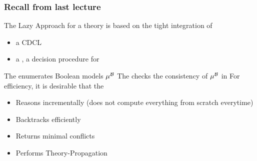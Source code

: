 \begin{frame}
  \frametitle{Recall from last lecture}

  The Lazy Approach for a theory \T is based on the tight integration of
  \begin{itemize}
    \item a CDCL \satsolver
    \item a \tsolver, a decision procedure for \T
  \end{itemize}
  \vfill
  \pause
  The \satsolver enumerates Boolean models $\mu^{\mathcal{B}}$
  \vfill
  The \tsolver checks the consistency of $\mu^{\mathcal{B}}$ in \T
  \vfill
  \pause
  For efficiency, it is desirable that the \tsolver
  \begin{itemize}
    \item Reasons incrementally (does not compute everything from scratch everytime)
    \item Backtracks efficiently
    \item Returns minimal conflicts
    \item Performs Theory-Propagation
  \end{itemize}

\end{frame}
